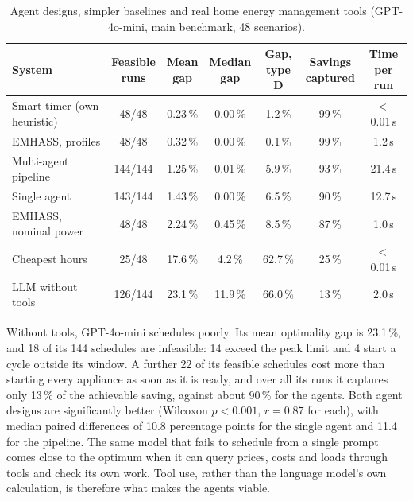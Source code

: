 \begin{table}[h!]
\caption{Agent designs, simpler baselines and real home energy management tools (GPT-4o-mini, main benchmark, 48 scenarios).}
\label{tab:baselines}
\small
\begin{tabular*}{\textwidth}{@{\extracolsep{\fill}}lcccccc}
\toprule
System & \makecell{Feasible\\runs} & \makecell{Mean\\gap} & \makecell{Median\\gap} & \makecell{Gap,\\type D} & \makecell{Savings\\captured} & \makecell{Time\\per run} \\
\midrule
Smart timer (own heuristic) & 48/48 & 0.23\,\% & 0.00\,\% & 1.2\,\% & 99\,\% & $<$\,0.01\,s \\
EMHASS, profiles & 48/48 & 0.32\,\% & 0.00\,\% & 0.1\,\% & 99\,\% & 1.2\,s \\
Multi-agent pipeline & 144/144 & 1.25\,\% & 0.01\,\% & 5.9\,\% & 93\,\% & 21.4\,s \\
Single agent & 143/144 & 1.43\,\% & 0.00\,\% & 6.5\,\% & 90\,\% & 12.7\,s \\
EMHASS, nominal power & 48/48 & 2.24\,\% & 0.45\,\% & 8.5\,\% & 87\,\% & 1.0\,s \\
Cheapest hours & 25/48 & 17.6\,\% & 4.2\,\% & 62.7\,\% & 25\,\% & $<$\,0.01\,s \\
LLM without tools & 126/144 & 23.1\,\% & 11.9\,\% & 66.0\,\% & 13\,\% & 2.0\,s \\
\bottomrule
\end{tabular*}
\end{table}

Without tools, GPT-4o-mini schedules poorly. Its mean optimality gap is
23.1\,\%, and 18 of its 144 schedules are infeasible: 14 exceed the peak
limit and 4 start a cycle outside its window. A further 22 of its
feasible schedules cost more than starting every appliance as soon as it
is ready, and over all its runs it captures only 13\,\% of the
achievable saving, against about 90\,\% for the agents. Both agent designs are significantly better (Wilcoxon
$p < 0.001$, $r = 0.87$ for each), with median paired differences of
10.8 percentage points for the single agent and 11.4 for the pipeline.
The same model that fails to schedule from a single prompt comes close to
the optimum when it can query prices, costs and loads through tools and
check its own work. Tool use, rather than the language model's own
calculation, is therefore what makes the agents viable.


